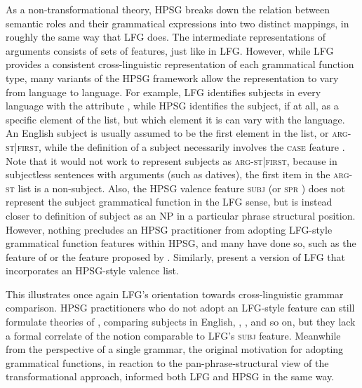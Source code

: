 As a non-transformational theory, HPSG breaks down the relation between semantic roles and their grammatical expressions into two distinct mappings, in roughly the same way that LFG does.  The intermediate representations of arguments consists of sets of features, just like in LFG.  However, while LFG provides a consistent cross-linguistic representation of each grammatical function type, many variants of the HPSG framework allow the representation to vary from language to language.  For example, LFG identifies subjects in every language with the attribute , while HPSG identifies the subject, if at all, as a specific element of the  list, but which element it is can vary with the language.  An English subject is usually assumed to be the first element in the list, or \textsc{arg-st|first}, while the definition of a  subject necessarily involves the \textsc{case} feature \citep{Reis82}.  Note that it would not work to represent  subjects as \textsc{arg-st|first}, because in   subjectless sentences with arguments (such as datives),  the first item in the \textsc{arg-st} list is a non-subject.  Also, the HPSG valence feature \textsc{subj} (or \textsc{spr} ) 
does not represent the subject grammatical function in the LFG sense, but is instead closer to  
 definition of subject as an NP in a particular phrase structural position.  However, nothing precludes an HPSG practitioner from adopting LFG-style grammatical function features within HPSG, and many have done so, such as the  feature of \citet{KDHB2007a} or the  feature proposed by \citet{Pollard94a}.  Similarly, \citet{andrews1999complex} present a version of LFG that incorporates an HPSG-style valence list.  

This illustrates once again LFG's orientation towards cross-linguistic grammar comparison.  HPSG practitioners who do not adopt an LFG-style  feature can still formulate theories of , comparing subjects in English, , , and so on, but they lack a formal correlate of the notion  comparable to LFG's \textsc{subj} feature.  Meanwhile from the perspective of a single grammar, the original motivation for adopting grammatical functions, in reaction to the pan-phrase-structural view of the transformational approach, informed both LFG and HPSG in the same way.  

